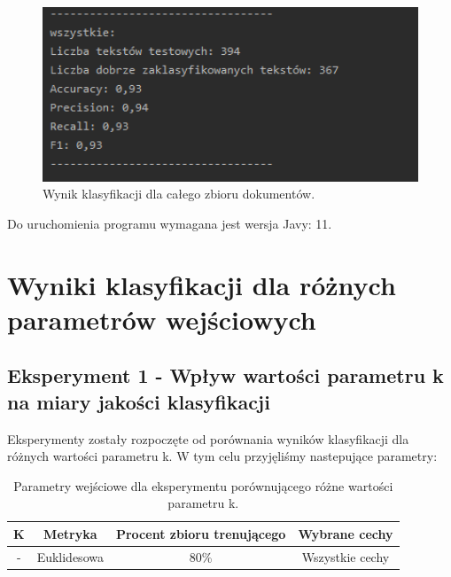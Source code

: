 \documentclass{classrep}
\begin{document}
\begin{figure}[h!]
 \centering
 \includegraphics[width=14cm]{wynik.png}
 \vspace{-0.3cm}
 \caption{Wynik klasyfikacji dla całego zbioru dokumentów.}
 \label{Wynik klasyfikacji.}
\end{figure}
\newpage

Do uruchomienia programu wymagana jest wersja Javy: 11. 



\section{Wyniki klasyfikacji dla różnych parametrów wejściowych}
\subsection{Eksperyment 1 - Wpływ wartości parametru k na miary jakości klasyfikacji}
\label{subsection:ex1}

Eksperymenty zostały rozpoczęte od porównania wyników klasyfikacji dla różnych wartości parametru k.
W tym celu przyjęliśmy nastepujące parametry:
 
\begin{table}[h!]
\caption{Parametry wejściowe dla eksperymentu porównującego różne wartości parametru k. }
\centering
\vspace{0.1cm}
 \begin{tabular}{c c c c}
    \textbf{K} & \textbf{Metryka}   & \textbf{Procent zbioru trenującego}  & \textbf{Wybrane cechy}   \\
\hline
- & Euklidesowa & 80\% &  Wszystkie cechy\\
\end {tabular}
\label {Parametry wejściowe dla eksperymentu porównującego różne wartości parametru k. }
\end{table}
\end{document}
